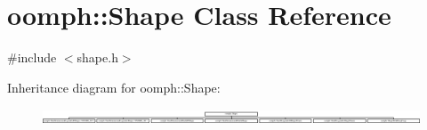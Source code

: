 \hypertarget{classoomph_1_1Shape}{}\section{oomph\+:\+:Shape Class Reference}
\label{classoomph_1_1Shape}


{\ttfamily \#include $<$shape.\+h$>$}

Inheritance diagram for oomph\+:\+:Shape\+:\begin{figure}[H]
\begin{center}
\leavevmode
\includegraphics[height=0.462428cm]{classoomph_1_1Shape}
\end{center}
\end{figure}
